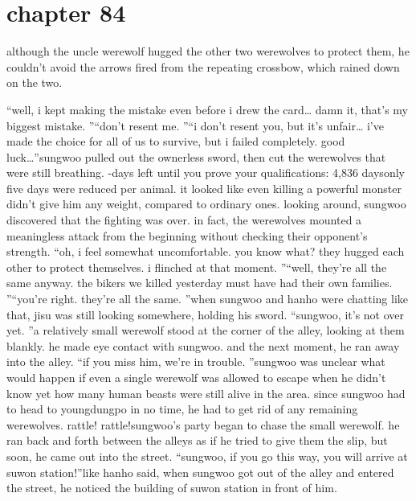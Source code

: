 \section{chapter 84}

                            although the uncle werewolf hugged the other two werewolves to protect them, he couldn’t avoid the arrows fired from the repeating crossbow, which rained down on the two.





“well, i kept making the mistake even before i drew the card… damn it, that’s my biggest mistake.
”“don’t resent me.
”“i don’t resent you, but it’s unfair… i’ve made the choice for all of us to survive, but i failed completely.
 good luck…”sungwoo pulled out the ownerless sword, then cut the werewolves that were still breathing.
-days left until you prove your qualifications: 4,836 daysonly five days were reduced per animal.
 it looked like even killing a powerful monster didn’t give him any weight, compared to ordinary ones.
looking around, sungwoo discovered that the fighting was over.
 in fact, the werewolves mounted a meaningless attack from the beginning without checking their opponent’s strength.
“oh, i feel somewhat uncomfortable.
 you know what? they hugged each other to protect themselves.
 i flinched at that moment.
”“well, they’re all the same anyway.
 the bikers we killed yesterday must have had their own families.
”“you’re right.
 they’re all the same.
”when sungwoo and hanho were chatting like that, jisu was still looking somewhere, holding his sword.
“sungwoo, it’s not over yet.
”a relatively small werewolf stood at the corner of the alley, looking at them blankly.
 he made eye contact with sungwoo.
 and the next moment, he ran away into the alley.
“if you miss him, we’re in trouble.
”sungwoo was unclear what would happen if even a single werewolf was allowed to escape when he didn’t know yet how many human beasts were still alive in the area.
 since sungwoo had to head to youngdungpo in no time, he had to get rid of any remaining werewolves.
rattle! rattle!sungwoo’s party began to chase the small werewolf.
 he ran back and forth between the alleys as if he tried to give them the slip, but soon, he came out into the street.
“sungwoo, if you go this way, you will arrive at suwon station!”like hanho said, when sungwoo got out of the alley and entered the street, he noticed the building of suwon station in front of him.

